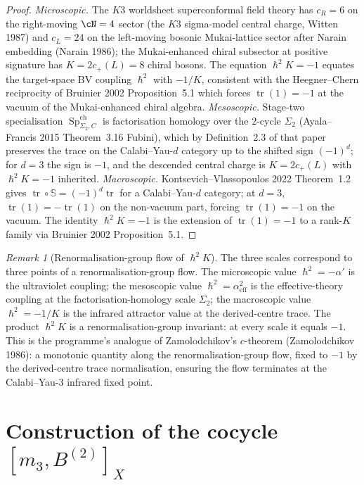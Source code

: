 \documentclass[11pt,reqno]{amsart}
\theoremstyle{plain}
\theoremstyle{definition}
\theoremstyle{remark}
\newtheorem{remark}[theorem]{Remark}
\DeclareMathOperator{\tr}{tr}
\DeclareMathOperator{\Sp}{Sp}
\newcommand{\hbar}{{\hslash}}
\begin{document}
\begin{proof}
\emph{Microscopic.} The $K3$ worldsheet superconformal field theory has $c_R = 6$ on the right-moving $\cN = 4$ sector (the $K3$ sigma-model central charge, Witten 1987) and $c_L = 24$ on the left-moving bosonic Mukai-lattice sector after Narain embedding (Narain 1986); the Mukai-enhanced chiral subsector at positive signature has $K = 2 c_+(L) = 8$ chiral bosons. The equation $\hbar^2 K = -1$ equates the target-space BV coupling $\hbar^2$ with $-1/K$, consistent with the Heegner--Chern reciprocity of Bruinier 2002 Proposition~5.1 which forces $\tr(1) = -1$ at the vacuum of the Mukai-enhanced chiral algebra. \emph{Mesoscopic.} Stage-two specialisation $\Sp^{\mathrm{ch}}_{\Sigma_2, C}$ is factorisation homology over the $2$-cycle $\Sigma_2$ (Ayala--Francis 2015 Theorem~3.16 Fubini), which by Definition~2.3 of that paper preserves the trace on the Calabi--Yau-$d$ category up to the shifted sign $(-1)^d$; for $d = 3$ the sign is $-1$, and the descended central charge is $K = 2c_+(L)$ with $\hbar^2 K = -1$ inherited. \emph{Macroscopic.} Kontsevich--Vlassopoulos 2022 Theorem~1.2 gives $\tr \circ \mathbb{S} = (-1)^d \tr$ for a Calabi--Yau-$d$ category; at $d = 3$, $\tr(1) = -\tr(1)$ on the non-vacuum part, forcing $\tr(1) = -1$ on the vacuum. The identity $\hbar^2 K = -1$ is the extension of $\tr(1) = -1$ to a rank-$K$ family via Bruinier 2002 Proposition~5.1.
\end{proof}

\begin{remark}[Renormalisation-group flow of $\hbar^2 K$]
\label{rem:rg-flow}
The three scales correspond to three points of a renormalisation-group flow. The microscopic value $\hbar^2 = -\alpha'$ is the ultraviolet coupling; the mesoscopic value $\hbar^2 = \alpha_{\mathrm{eff}}^2$ is the effective-theory coupling at the factorisation-homology scale $\Sigma_2$; the macroscopic value $\hbar^2 = -1/K$ is the infrared attractor value at the derived-centre trace. The product $\hbar^2 K$ is a renormalisation-group invariant: at every scale it equals $-1$. This is the programme's analogue of Zamolodchikov's $c$-theorem (Zamolodchikov 1986): a monotonic quantity along the renormalisation-group flow, fixed to $-1$ by the derived-centre trace normalisation, ensuring the flow terminates at the Calabi--Yau-$3$ infrared fixed point.
\end{remark}


\section{Construction of the cocycle $[m_3, B^{(2)}]_X$}
\label{sec:cocycle}
\end{document}
